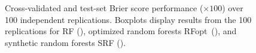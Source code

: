 \documentclass{bmcart}
\def\RFopt{RFopt}
\newcommand{\black}{\textcolor{black}}
\newcommand{\red}{\textcolor{red}}
\newcommand{\blue}{\textcolor{blue}}
\begin{document}
\begin{backmatter}
  \begin{figure}[ht]
  \caption{  Cross-validated
    and test-set Brier score performance ($\times 100$)
    over 100 independent replications.  Boxplots display results
    from the 100 replications for
    RF (\red{\blacksquare}), optimized random
    forests \RFopt\, (\blue{\blacksquare}), and synthetic random forests
    SRF (\black{\blacksquare}).}
  \begin{center}
  \end{center}
  \end{figure}






\newpage


\end{backmatter}
\end{document}
